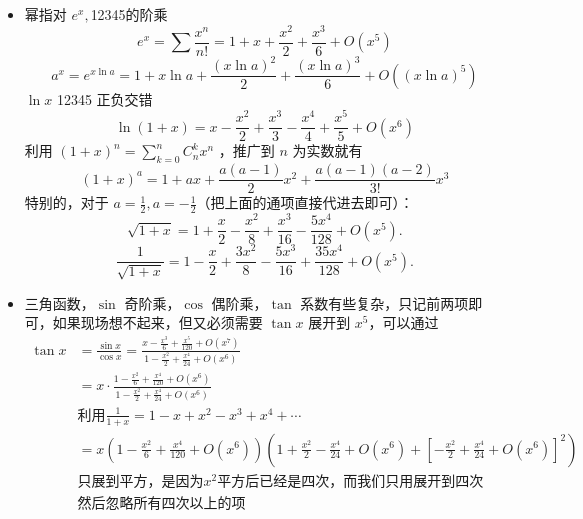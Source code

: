 \documentclass[lang=cn,newtx,10pt,scheme=chinese]{elegantbook}
\begin{document}
\begin{itemize}
  \item 幂指对 $e^{x},$12345的阶乘 \begin{equation}
    e^{x}=\sum \frac{x^{n}}{n!} =1+x+\frac{x^{2}}{2}+\frac{x^{3}}{6}+ O(x^{5})
  \end{equation}
  \begin{equation}
    a^{x}=e^{x \ln a}=1+x \ln a+\frac{(x \ln a)^{2}}{2}+\frac{(x \ln a)^{3}}{6}+ O((x \ln a)^{5})
  \end{equation}
  $ \ln x$ 12345 正负交错
  \begin{equation}
    \ln(1+x)=x-\frac{x^{2}}{2}+\frac{x^{3}}{3}-\frac{x^{4}}{4}+\frac{x^{5}}{5}+O(x^{6})
  \end{equation}
  利用 $(1+x)^{n}=\sum_{k=0}^{n} C_{n}^{k}x^{n}$ ，推广到 $n$ 为实数就有
  \begin{equation}
    (1+x)^{a}=1+ax+\frac{a(a-1)}{2}x^{2}+\frac{a(a-1)(a-2)}{3!}x^{3}
  \end{equation}
  特别的，对于 $a=\frac{1}{2},a=-\frac{1}{2}$（把上面的通项直接代进去即可）：
  \begin{equation}
    \sqrt{1+x}=1+\frac{x}{2}-\frac{x^{2}}{8}+\frac{x^{3}}{16}-\frac{5x^{4}}{128}+O(x^{5}).
  \end{equation}
  \begin{equation}
    \frac{1}{\sqrt{1+x}}=1-\frac{x}{2}+\frac{3x^{2}}{8}-\frac{5x^{3}}{16}+\frac{35x^{4}}{128}+O(x^{5}).
  \end{equation}
  \item 三角函数，$\sin$ 奇阶乘，$\cos$ 偶阶乘，$\tan$ 系数有些复杂，只记前两项即可，如果现场想不起来，但又必须需要 $\tan x$ 展开到 $x^{5}$，可以通过 
  \begin{equation}
    \begin{aligned}
    \tan x&= \frac{\sin x}{\cos x}= \frac{x-\frac{x^{3}}{6}+\frac{x^{5}}{120}+O(x^{7})}{1-\frac{x^{2}}{2}+\frac{x^{4}}{24}+O(x^{6})}\\
    &=x\cdot \frac{1-\frac{x^{2}}{6}+\frac{x^{4}}{120}+O(x^{6})}{1-\frac{x^{2}}{2}+\frac{x^{4}}{24}+O(x^{6})}\\
    &\text{利用} \frac{1}{1+x}=1-x+x^{2}-x^{3}+x^{4}+ \cdots  \\
    &=x(1-\frac{x^{2}}{6}+\frac{x^{4}}{120}+O(x^{6}))(1+\frac{x^{2}}{2}-\frac{x^{4}}{24}+O(x^{6})+[-\frac{x^{2}}{2}+\frac{x^{4}}{24}+O(x^{6})]^{2}) \\
    &\text{只展到平方，是因为} x^{2} \text{平方后已经是四次，而我们只用展开到四次} \\
    &\text{然后忽略所有四次以上的项}\\

\end{aligned}
\end{equation}
\end{itemize}
\end{document}
